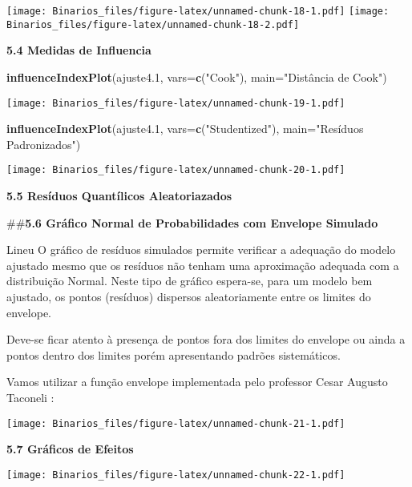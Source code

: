 \documentclass[]{article}
\newenvironment{Shaded}{\begin{snugshade}}{\end{snugshade}}
\newcommand{\KeywordTok}[1]{\textcolor[rgb]{0.13,0.29,0.53}{\textbf{#1}}}
\newcommand{\DataTypeTok}[1]{\textcolor[rgb]{0.13,0.29,0.53}{#1}}
\newcommand{\FloatTok}[1]{\textcolor[rgb]{0.00,0.00,0.81}{#1}}
\newcommand{\StringTok}[1]{\textcolor[rgb]{0.31,0.60,0.02}{#1}}
\newcommand{\NormalTok}[1]{#1}
\begin{document}
\texttt{[image: Binarios\_files/figure-latex/unnamed-chunk-18-1.pdf]}
\texttt{[image: Binarios\_files/figure-latex/unnamed-chunk-18-2.pdf]}

\textbf{5.4 Medidas de Influencia}

\begin{Shaded}
\begin{Highlighting}[]
\KeywordTok{influenceIndexPlot}\NormalTok{(ajuste4}\FloatTok{.1}\NormalTok{, }\DataTypeTok{vars=}\KeywordTok{c}\NormalTok{(}\StringTok{"Cook"}\NormalTok{), }\DataTypeTok{main=}\StringTok{"Distância de Cook"}\NormalTok{)}
\end{Highlighting}
\end{Shaded}

\texttt{[image: Binarios\_files/figure-latex/unnamed-chunk-19-1.pdf]}

\begin{Shaded}
\begin{Highlighting}[]
\KeywordTok{influenceIndexPlot}\NormalTok{(ajuste4}\FloatTok{.1}\NormalTok{, }\DataTypeTok{vars=}\KeywordTok{c}\NormalTok{(}\StringTok{"Studentized"}\NormalTok{), }\DataTypeTok{main=}\StringTok{"Resíduos Padronizados"}\NormalTok{)}
\end{Highlighting}
\end{Shaded}

\texttt{[image: Binarios\_files/figure-latex/unnamed-chunk-20-1.pdf]}

\textbf{5.5 Resíduos Quantílicos Aleatoriazados}

\#\#\textbf{5.6 Gráfico Normal de Probabilidades com Envelope Simulado}

Lineu O gráfico de resíduos simulados permite verificar a adequação do
modelo ajustado mesmo que os resíduos não tenham uma aproximação
adequada com a distribuição Normal. Neste tipo de gráfico espera-se,
para um modelo bem ajustado, os pontos (resíduos) dispersos
aleatoriamente entre os limites do envelope.

Deve-se ficar atento à presença de pontos fora dos limites do envelope
ou ainda a pontos dentro dos limites porém apresentando padrões
sistemáticos.

Vamos utilizar a função envelope implementada pelo professor Cesar
Augusto Taconeli :

\texttt{[image: Binarios\_files/figure-latex/unnamed-chunk-21-1.pdf]}

\textbf{5.7 Gráficos de Efeitos}

\texttt{[image: Binarios\_files/figure-latex/unnamed-chunk-22-1.pdf]}
\end{document}

